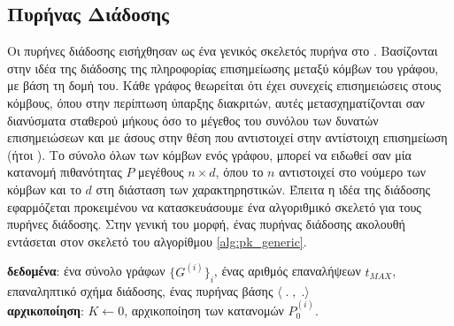 \subsection{Πυρήνας Διάδοσης}
\label{ssec:p2k}
Οι πυρήνες διάδοσης εισήχθησαν ως ένα γενικός σκελετός πυρήνα στο \cite{Neumann2016}.
Βασίζονται στην ιδέα της διάδοσης της πληροφορίας επισημείωσης μεταξύ κόμβων του γράφου, με βάση τη δομή του.
Κάθε γράφος θεωρείται ότι έχει συνεχείς επισημειώσεις στους κόμβους, όπου στην περίπτωση ύπαρξης διακριτών, αυτές μετασχηματίζονται σαν διανύσματα σταθερού μήκους όσο το μέγεθος του συνόλου των δυνατών επισημειώσεων και με άσους στην θέση που αντιστοιχεί στην αντίστοιχη επισημείωση (ήτοι ).
Το σύνολο όλων των κόμβων ενός γράφου, μπορεί να ειδωθεί σαν μία κατανομή πιθανότητας $P$ μεγέθους $n \times d$, όπου το $n$ αντιστοιχεί στο νούμερο των κόμβων και το $d$ στη διάσταση των χαρακτηρηστικών.
Έπειτα η ιδέα της διάδοσης εφαρμόζεται προκειμένου να κατασκευάσουμε ένα αλγοριθμικό σκελετό για τους πυρήνες διάδοσης.
Στην γενική του μορφή, ένας πυρήνας διάδοσης ακολουθή εντάσεται στον σκελετό του αλγορίθμου \ref{alg:pk_generic}.
\begin{algorithm}[]
\textbf{δεδομένα}: ένα σύνολο γράφων $\{G^{(i)}\}_{i}$, ένας αριθμός επαναλήψεων $t_{MAX}$, επαναληπτικό σχήμα διάδοσης, ένας πυρήνας βάσης $\langle\;.\;,\;. \rangle$
\\
\textbf{αρχικοποίηση}: $K \leftarrow 0$, αρχικοποίηση των κατανομών $P_{0}^{(i)}$.

\caption{}
\label{alg:pk_generic}
\end{algorithm}

